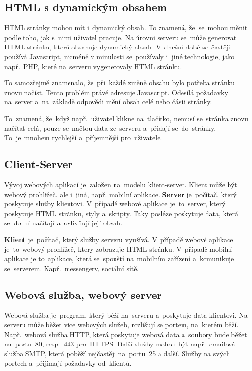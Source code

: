 \documentclass[14pt,a4paper]{article}
\begin{document}
        \subsection{HTML s dynamickým obsahem}
        HTML stránky mohou mít i~dynamický obsah. To znamená, že~se~mohou měnit podle toho, jak s~nimi uživatel pracuje.
        Na úrovni serveru se~může generovat HTML stránka, která obsahuje dynamický obsah. V~dnešní době se~častěji používá Javascript,
        nicméně v minulosti se~používaly i~jiné technologie, jako např.~PHP, které na~serveru vygenerovaly HTML stránku.

        To samozřejmě znamenalo, že~při~každé změně obsahu bylo potřeba stránku znovu načíst. Tento problém právě adresuje Javascript.
        Odesílá požadavky na~server a~na~základě odpovědi mění obsah celé nebo části stránky.

        To~znamená, že~když např.~uživatel klikne na~tlačítko, nemusí se~stránka znovu načítat celá, pouze se~načtou data ze~serveru
        a~přidají se~do~stránky. To~je~mnohem rychlejší a~příjemnější pro~uživatele.
        
        \subsection{Client-Server}
        Vývoj webových aplikací je~založen na~modelu klient-server. Klient může být webový prohlížeč, ale i~jiná, např. mobilní aplikace.
        \textbf{Server} je~počítač, který poskytuje služby klientovi. V~případě webové aplikace je~to~server, který poskytuje HTML stránku, styly a~skripty.
        Taky posléze poskytuje data, která se~do~ní načítají a~ovlivňují její obsah.

        \textbf{Klient} je~počítač, který služby serveru využívá. V~případě webové aplikace je~to~webový prohlížeč, který zobrazuje HTML stránku.
        V~případě mobilní aplikace je to~aplikace, která se~spouští na~mobilním zařízení a~komunikuje se~serverem. Např.~messengery, sociální sítě.

        \subsection{Webová služba, webový server}
        Webová služba je~program, který běží na~serveru a~poskytuje data klientovi. Na serveru může běžet více webových služeb,
        rozlišují se portem, na~kterém běží. Např.~webová služba HTTP, která poskytuje webová data a~soubory bude běžet na~portu~80,
        resp.~443 pro~HTTPS. Další služby mohou být např.~emailová služba SMTP, která poběží nejčastěji na~portu~25 a další.
        Služby  na svých portech a~přijímají požadavky od~klientů.
\end{document}
